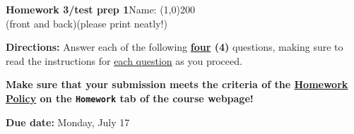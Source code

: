 \documentclass[12pt]{article}
\begin{document}
	\begin{flushright}
		{\large \textbf{Homework 3}}{\textbf{\scriptsize{/test prep 1}}}\hfill Name: \line(1,0){200}\\
		{\mbox{\hspace{1.75mm}}\small(front and back)}\hfill{\small (please print neatly!)}\mbox{\hspace{0.7in}}
	\end{flushright}
	\vspace{-1.5mm}
	\begin{adjustwidth}{0.5in}{0.5in}
		\begin{tcolorbox}[
			arc=0pt, colback=white, colframe=black, boxrule=0.5pt, before upper={\parindent15pt \parskip=3mm}]
			
			{\noindent\textbf{Directions:} Answer each of the following \textbf{\ul{four} (4)} questions, making sure to read the instructions for \ul{each question} as you proceed. \par
			
			\textbf{Make sure that your submission meets the criteria of the \ul{Homework Policy} on the \texttt{Homework} tab of the course webpage!}
			
			\begin{center}\end{center}
		
			\hfill\textbf{Due date:} Monday, July 17}
		\end{tcolorbox}
	\end{adjustwidth}
		
\end{document}
